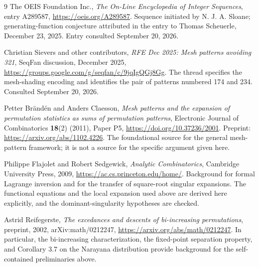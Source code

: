 \documentclass[11pt,letterpaper]{article}
\numberwithin{equation}{section}
\theoremstyle{definition}
\begin{document}
\begin{thebibliography}{9}
\small
{}
The OEIS Foundation Inc.,
\emph{The On-Line Encyclopedia of Integer Sequences}, entry A289587,
\url{https://oeis.org/A289587}.
Sequence initiated by N. J. A. Sloane; generating-function conjecture
attributed in the entry to Thomas Scheuerle, December 23, 2025.
Entry consulted September 20, 2026.

Christian Sievers and other contributors,
\emph{RFE Dec 2025: Mesh patterns avoiding 321}, SeqFan discussion,
December 2025,
\url{https://groups.google.com/g/seqfan/c/9jqIgQGj8Gg}.
The thread specifies the mesh-shading encoding and identifies the pair
of patterns numbered 174 and 234. Consulted September 20, 2026.

Petter Br\"and\'en and Anders Claesson,
\emph{Mesh patterns and the expansion of permutation statistics as sums
of permutation patterns}, Electronic Journal of Combinatorics
\textbf{18}(2) (2011), Paper P5, \url{https://doi.org/10.37236/2001}.
Preprint: \url{https://arxiv.org/abs/1102.4226}.
The foundational source for the general mesh-pattern framework; it is not
a source for the specific argument given here.

Philippe Flajolet and Robert Sedgewick,
\emph{Analytic Combinatorics}, Cambridge University Press, 2009,
\url{https://ac.cs.princeton.edu/home/}.
Background for formal Lagrange inversion and for the transfer of
square-root singular expansions. The functional equations and the local
expansion used above are derived here explicitly, and the
dominant-singularity hypotheses are checked.

Astrid Reifegerste,
\emph{The excedances and descents of bi-increasing permutations},
preprint, 2002, arXiv:math/0212247,
\url{https://arxiv.org/abs/math/0212247}.
In particular, the bi-increasing characterization, the fixed-point
separation property, and Corollary 3.7 on the Narayana distribution
provide background for the self-contained preliminaries above.
\end{thebibliography}
\end{document}
